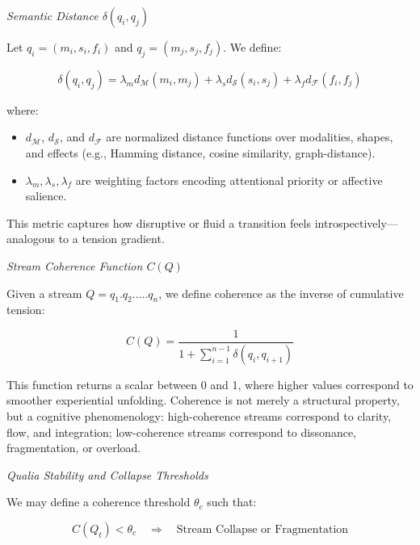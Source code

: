 \documentclass[11pt]{article}
\numberwithin{equation}{section} %
\begin{document}
\bigskip

\noindent \textit{Semantic Distance \(\delta(q_i, q_j)\)}

Let \( q_i = (m_i, s_i, f_i) \) and \( q_j = (m_j, s_j, f_j) \). We define:

\begin{equation}
\delta(q_i, q_j) = \lambda_m d_\mathcal{M}(m_i, m_j) + \lambda_s d_\mathcal{S}(s_i, s_j) + \lambda_f d_\mathcal{F}(f_i, f_j)
\end{equation}

\noindent where:
\begin{itemize}
  \item \( d_\mathcal{M} \), \( d_\mathcal{S} \), and \( d_\mathcal{F} \) are normalized distance functions over modalities, shapes, and effects (e.g., Hamming distance, cosine similarity, graph-distance).
  \item \( \lambda_m, \lambda_s, \lambda_f \) are weighting factors encoding attentional priority or affective salience.
\end{itemize}

This metric captures how disruptive or fluid a transition feels introspectively—analogous to a tension gradient.

\bigskip

\noindent \textit{Stream Coherence Function \(C(Q)\)}

Given a stream \( Q = q_1 . q_2 . \dots . q_n \), we define coherence as the inverse of cumulative tension:

\begin{equation}
C(Q) = \frac{1}{1 + \sum_{i=1}^{n-1} \delta(q_i, q_{i+1})}
\end{equation}

This function returns a scalar between 0 and 1, where higher values correspond to smoother experiential unfolding. Coherence is not merely a structural property, but a cognitive phenomenology: high-coherence streams correspond to clarity, flow, and integration; low-coherence streams correspond to dissonance, fragmentation, or overload.

\bigskip

\noindent \textit{Qualia Stability and Collapse Thresholds}

We may define a coherence threshold \( \theta_c \) such that:

\begin{equation}
C(Q_t) < \theta_c \quad \Rightarrow \quad \text{Stream Collapse or Fragmentation}
\end{equation}
\end{document}
